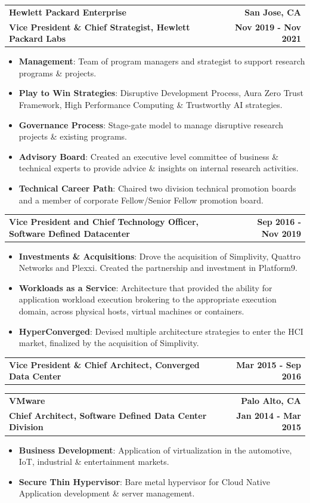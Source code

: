 \documentclass[letterpaper,10pt, sans]{article}
\makeatletter
\newcommand{\resumeCompanyHeading}[4]{
  \vspace{-1pt}
    \item
    \begin{tabular*}{1.0\textwidth}[t]{l@{\extracolsep{\fill}}r}
      \textbf{#1} & \textbf{#2} \\
      \textbf{#3} & \textbf{#4}
    \end{tabular*}\vspace{-1pt}
  }
\newcommand{\resumeCompanyPositionHeading}[2]{
    \vspace{-1pt}
      \item
      \begin{tabular*}{1.0\textwidth}{l@{\extracolsep{\fill}}r}
        \textbf{#1} & \textbf{#2}
    \end{tabular*}\vspace{-1pt}
}
\newcommand{\resumeItem}[2]{\item{{\textbf{#1}}: {#2 \vspace{1pt}}}}
\newcommand{\resumeItemListStart}{\begin{itemize}}\vspace{-1pt}
\newcommand{\resumeItemListEnd}{\end{itemize}}\vspace{-1pt}
\makeatother
\begin{document}
        \resumeCompanyHeading
          {Hewlett Packard Enterprise}
          {San Jose, CA}
          {Vice President \& Chief Strategist, Hewlett Packard Labs}
          {Nov 2019 - Nov 2021}
            \resumeItemListStart
                \resumeItem{Management}{Team of program managers and strategist to support research programs \& projects.}
                \resumeItem{Play to Win Strategies}{Disruptive Development Process, Aura Zero Trust Framework, High Performance Computing \& Trustworthy AI strategies.}
                \resumeItem{Governance Process}{Stage-gate model to manage disruptive research projects \& existing programs.}
                \resumeItem{Advisory Board}{Created an executive level committee of business \& technical experts to provide advice \& insights on internal research activities.}
                \resumeItem{Technical Career Path}{Chaired two division technical promotion boards and a member of corporate Fellow/Senior Fellow promotion board.}
            \resumeItemListEnd

          \resumeCompanyPositionHeading
            {Vice President and Chief Technology Officer, Software Defined Datacenter}
            {Sep 2016 - Nov 2019}
            \resumeItemListStart
                \resumeItem{Investments \& Acquisitions}{Drove the acquisition of Simplivity, Quattro Networks and Plexxi. Created the partnership and investment in Platform9.}
                \resumeItem{Workloads as a Service}{Architecture that provided the ability for application workload execution brokering to the appropriate execution domain, across
                           physical hosts, virtual machines or containers.}
                \resumeItem{HyperConverged}{Devised multiple architecture strategies to enter the HCI market, finalized by the acquisition of Simplivity.}
            \resumeItemListEnd

          \resumeCompanyPositionHeading
            {Vice President \& Chief Architect, Converged Data Center}
            {Mar 2015 - Sep 2016}

        \resumeCompanyHeading
            {VMware}
            {Palo Alto, CA}
            {Chief Architect, Software Defined Data Center Division}
            {Jan 2014 - Mar 2015}
            \resumeItemListStart
                \resumeItem{Business Development}{Application of virtualization in the automotive, IoT, industrial \& entertainment markets.}
                \resumeItem{Secure Thin Hypervisor}{Bare metal hypervisor for Cloud Native Application development \& server management.}
            \resumeItemListEnd
\end{document}
